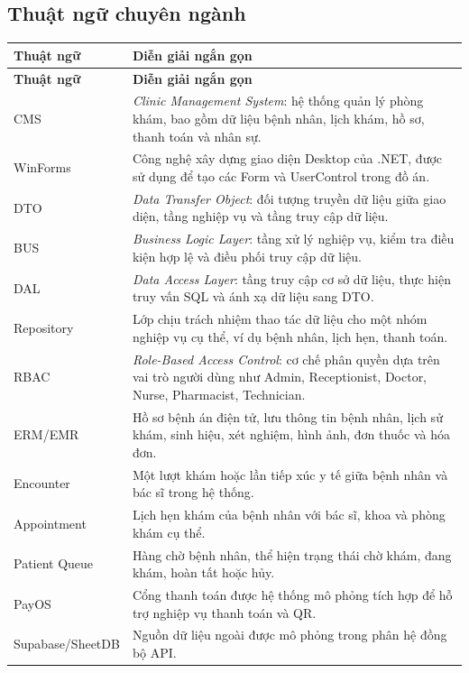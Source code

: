 \documentclass[12pt,a4paper]{article}
\numberwithin{figure}{subsection}
\numberwithin{table}{subsection}
\begin{document}
\subsection*{Thuật ngữ chuyên ngành}
\renewcommand{\arraystretch}{1.22}
\begin{longtable}{|p{3.2cm}|p{10.8cm}|}
\hline
\textbf{Thuật ngữ} & \textbf{Diễn giải ngắn gọn} \\
\hline
\endfirsthead
\hline
\textbf{Thuật ngữ} & \textbf{Diễn giải ngắn gọn} \\
\hline
\endhead
CMS & \textit{Clinic Management System}: hệ thống quản lý phòng khám, bao gồm dữ liệu bệnh nhân, lịch khám, hồ sơ, thanh toán và nhân sự. \\
\hline
WinForms & Công nghệ xây dựng giao diện Desktop của .NET, được sử dụng để tạo các Form và UserControl trong đồ án. \\
\hline
DTO & \textit{Data Transfer Object}: đối tượng truyền dữ liệu giữa giao diện, tầng nghiệp vụ và tầng truy cập dữ liệu. \\
\hline
BUS & \textit{Business Logic Layer}: tầng xử lý nghiệp vụ, kiểm tra điều kiện hợp lệ và điều phối truy cập dữ liệu. \\
\hline
DAL & \textit{Data Access Layer}: tầng truy cập cơ sở dữ liệu, thực hiện truy vấn SQL và ánh xạ dữ liệu sang DTO. \\
\hline
Repository & Lớp chịu trách nhiệm thao tác dữ liệu cho một nhóm nghiệp vụ cụ thể, ví dụ bệnh nhân, lịch hẹn, thanh toán. \\
\hline
RBAC & \textit{Role-Based Access Control}: cơ chế phân quyền dựa trên vai trò người dùng như Admin, Receptionist, Doctor, Nurse, Pharmacist, Technician. \\
\hline
ERM/EMR & Hồ sơ bệnh án điện tử, lưu thông tin bệnh nhân, lịch sử khám, sinh hiệu, xét nghiệm, hình ảnh, đơn thuốc và hóa đơn. \\
\hline
Encounter & Một lượt khám hoặc lần tiếp xúc y tế giữa bệnh nhân và bác sĩ trong hệ thống. \\
\hline
Appointment & Lịch hẹn khám của bệnh nhân với bác sĩ, khoa và phòng khám cụ thể. \\
\hline
Patient Queue & Hàng chờ bệnh nhân, thể hiện trạng thái chờ khám, đang khám, hoàn tất hoặc hủy. \\
\hline
PayOS & Cổng thanh toán được hệ thống mô phỏng tích hợp để hỗ trợ nghiệp vụ thanh toán và QR. \\
\hline
Supabase/SheetDB & Nguồn dữ liệu ngoài được mô phỏng trong phân hệ đồng bộ API. \\
\hline
\end{longtable}
\end{document}
